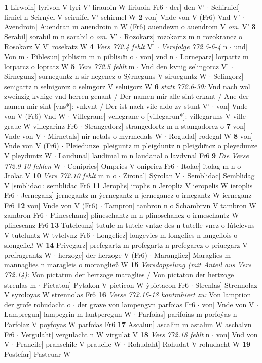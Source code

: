 \documentclass[8pt,a4paper,notitlepage]{article}
\begin{document}
\begin{table}[ht]
\begin{minipage}[t]{0.5\linewidth}
\textbf{1} Lirwoin] lyrivon V lyri V' lirauoin W liriuoin Fr6  $\cdot$ der] den V'  $\cdot$ Schirniel] lirniel n Scirnẏel V scirnifel V' schirmel W \textbf{2} von] Vnde von V (Fr6) Vnd V'  $\cdot$ Avendroin] Auendran m auendroin n W (Fr6) auendewn o auendrom V \textit{om.} V' \textbf{3} Serabil] sorabil m n sarabil o \textit{om.} V'  $\cdot$ Rozokarz] rozokartz m n rozokrancz o Rosokarz V V' rosekatz W \textbf{4} \textit{Vers 772.4 fehlt} V'   $\cdot$ \textit{Versfolge 772.5-6-4} n   $\cdot$ und] Von m  $\cdot$ Piblesun] piblisim m n piblisuͯn o  $\cdot$ von] vnd n  $\cdot$ Lorneparz] lorpartz m lorparcz o lopratz W \textbf{5} \textit{Vers 772.5 fehlt} m   $\cdot$ Vnd den kvnig selingorcz V'  $\cdot$ Sirnegunz] surneguntz n sir negencz o Sẏrneguns V sirueguntz W  $\cdot$ Selingorz] senigartz n selnigorcz o selmgorz V seluigorz W \textbf{6} \textit{statt 772.6-30:} Vnd nach wol zweinzig kvnige vnd herren genant / Der namen mir alle sint erkant / Ane der namen mir sint [vns*]: vnkvnt / Der ist nach vile aldo zv stunt V'   $\cdot$ von] Vnde von V (Fr6) Vnd W  $\cdot$ Villegrane] vellegrane o [villegarun*]: villegaruns V ville graue W villegarinz Fr6  $\cdot$ Strangedorz] strangedortz m n stangadorcz o \textbf{7} von] Vnde von V  $\cdot$ Mirnetals] nir netals o myrmedals W  $\cdot$ Rogudal] rodegal W \textbf{8} von] Vnde von V (Fr6)  $\cdot$ Pleiedunze] pleiguntz m pleigduntz n pleigduͯncz o pleyedunze V pleyduntz W  $\cdot$ Laudunal] laudimal m n laudanal o lavdvnal Fr6 \textbf{9} \textit{Die Verse 772.9-10 fehlen} W   $\cdot$ Conipries] Ompries V onipriez Fr6  $\cdot$ Itolac] itolag m n o Jtolac V \textbf{10} \textit{Vers 772.10 fehlt} m n o   $\cdot$ Zironal] Sẏrolan V  $\cdot$ Semblidac] Semblidag V [smblidac]: semblidac Fr6 \textbf{11} Jeroplis] iroplis n Jeropliz V ieropelis W ieroplis Fr6  $\cdot$ Jerneganz] jernegantz m ẏernegantz n jernegancz o irnegantz W ierneganz Fr6 \textbf{12} von] Vnde von V (Fr6)  $\cdot$ Tampron] tanbron n o Schambrvn V tambron W zambron Fr6  $\cdot$ Plineschanz] plineschantz m n plinoschancz o irmeschantz W plinescanz Fr6 \textbf{13} Tuteleunz] tutule m tutele vntze des n tutelle vncz o lútelevns V tuteluntz W tvtelvnz Fr6  $\cdot$ Longefiez] longevies m longefies n langeflois o slongefieß W \textbf{14} Privegarz] prefegartz m profegartz n prefegarcz o priuegarz V prefragrantz W  $\cdot$ herzoge] der herzoge V (Fr6)  $\cdot$ Marangliez] Maraglies m mannaglies n maragleis o morangließ W \textbf{15} \textit{Versdoppelung (mit Anteil aus Vers 772.14):} Von pictatun der hertzoge maraglies / Von pictaton der hertzoge strenlas m   $\cdot$ Pictaton] Pytakon V picticon W ẏpictacon Fr6  $\cdot$ Strenlas] Strennolaz V syroloyas W strennolas Fr6 \textbf{16} \textit{Verse 772.16-18 kontrahiert zu:} Von lamprion der grofe rohudacht o   $\cdot$ der grave von lampengvn parfoias Fr6  $\cdot$ von] Vnde von V  $\cdot$ Lampregun] lampegrin m lantperegun W  $\cdot$ Parfoias] parifoias m porfoẏas n Parfolaz V poyfoyas W parfoias Fr6 \textbf{17} Ascalun] ascalim m astalun W aschalvn Fr6  $\cdot$ Vergulaht] vergulacht n W virgulat V \textbf{18} \textit{Vers 772.18 fehlt} n   $\cdot$ von] Vnd von V  $\cdot$ Prancile] pranschile V praucile W  $\cdot$ Rohudaht] Rohudat V rohudacht W \textbf{19} Postefar] Pasteuar W  
\end{minipage}
\end{table}
\end{document}
